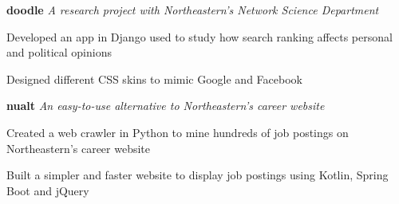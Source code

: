 \documentclass[11pt]{res}
\begin{document}
\begin{resume}
{{      {\bf doodle} {\it A research project with Northeastern's Network Science Department}
      \begin{itemize}
        {\item Developed an app in Django used to study how search ranking affects personal and political opinions}
        {\item Designed different CSS skins to mimic Google and Facebook}
      \end{itemize}

      {\bf nualt} {\it An easy-to-use alternative to Northeastern's career website}
      \begin{itemize}
        {\item Created a web crawler in Python to mine hundreds of job postings on Northeastern's career website}
        {\item Built a simpler and faster website to display job postings using Kotlin, Spring Boot and jQuery}
      \end{itemize}
    }
  }
\end{resume}
\end{document}
